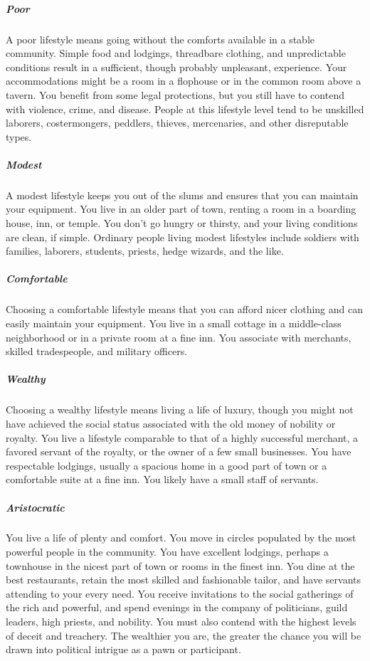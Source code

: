 \subparagraph*{Poor} A poor lifestyle means going without the comforts available in a stable community. Simple food and lodgings, threadbare clothing, and unpredictable conditions result in a sufficient, though probably unpleasant, experience. Your accommodations might be a room in a flophouse or in the common room above a tavern. You benefit from some legal protections, but you still have to contend with violence, crime, and disease. People at this lifestyle level tend to be unskilled laborers, costermongers, peddlers, thieves, mercenaries, and other disreputable types.

\subparagraph*{Modest} A modest lifestyle keeps you out of the slums and ensures that you can maintain your equipment. You live in an older part of town, renting a room in a boarding house, inn, or temple. You don't go hungry or thirsty, and your living conditions are clean, if simple. Ordinary people living modest lifestyles include soldiers with families, laborers, students, priests, hedge wizards, and the like.

\subparagraph*{Comfortable} Choosing a comfortable lifestyle means that you can afford nicer clothing and can easily maintain your equipment. You live in a small cottage in a middle-class neighborhood or in a private room at a fine inn. You associate with merchants, skilled tradespeople, and military officers.

\subparagraph*{Wealthy} Choosing a wealthy lifestyle means living a life of luxury, though you might not have achieved the social status associated with the old money of nobility or royalty. You live a lifestyle comparable to that of a highly successful merchant, a favored servant of the royalty, or the owner of a few small businesses. You have respectable lodgings, usually a spacious home in a good part of town or a comfortable suite at a fine inn. You likely have a small staff of servants.

\subparagraph*{Aristocratic} You live a life of plenty and comfort. You move in circles populated by the most powerful people in the community. You have excellent lodgings, perhaps a townhouse in the nicest part of town or rooms in the finest inn. You dine at the best restaurants, retain the most skilled and fashionable tailor, and have servants attending to your every need. You receive invitations to the social gatherings of the rich and powerful, and spend evenings in the company of politicians, guild leaders, high priests, and nobility. You must also contend with the highest levels of deceit and treachery. The wealthier you are, the greater the chance you will be drawn into political intrigue as a pawn or participant.

